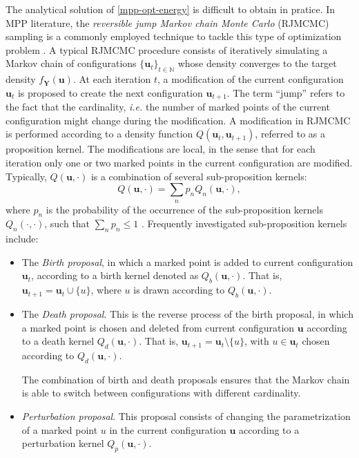 \documentclass[journal]{IEEEtran}
\begin{document}
The analytical solution of \eqref{mpp-opt-energy} is difficult to
obtain in pratice. In MPP literature, the \textit{reversible jump
  Markov chain Monte Carlo} (RJMCMC) sampling is a commonly employed
technique to tackle this type of optimization problem
\cite{descombes2013stochastic}. A typical RJMCMC procedure consists of
iteratively simulating a Markov chain of configurations
$\{ \mathbf{u}_t \}_{t \in \mathbb{N}}$ whose density converges to the
target density $f_{\mathbf{Y}}(\mathbf{u})$. At each iteration $t$, a
modification of the current configuration $\mathbf{u}_t$ is proposed
to create the next configuration $\mathbf{u}_{t+1}$. The term ``jump''
refers to the fact that the cardinality, \textit{i.e.} the number of
marked points of the current configuration might change during the
modification. A modification in RJMCMC is performed according to a
density function $Q(\mathbf{u}_t, \mathbf{u}_{t+1})$, referred to as a
proposition kernel. The modifications are local, in the sense that for
each iteration only one or two marked points in the current
configuration are modified. Typically, $Q(\mathbf{u}, \cdot)$ is a
combination of several sub-proposition kernels:
\begin{equation}
  \label{eq:sub-kernels}
  Q(\mathbf{u}, \cdot) = \sum_n p_n Q_n (\mathbf{u}, \cdot),
\end{equation}
where $p_n$ is the probability of the occurrence of the
sub-proposition kernels $Q_n(\cdot, \cdot)$, such that
$\sum_n p_n \le 1$ \cite{descombes2013stochastic}
\cite{verdie2014detecting}. Frequently investigated sub-proposition
kernels include:

\begin{itemize}

\item The \textit{Birth proposal}, in which a marked point is added to
  current configuration $\mathbf{u}_t$, according to a birth kernel
  denoted as $Q_{b}(\mathbf{u}, \cdot)$. That is,
  $\mathbf{u}_{t+1} = \mathbf{u}_t \cup \{u\}$, where $u$ is drawn
  according to $Q_{b}(\mathbf{u}, \cdot)$.

\item The \textit{Death proposal}. This is the reverse process of the
  birth proposal, in which a marked point is chosen and deleted from
  current configuration $\mathbf{u}$ according to a death kernel
  $Q_{d}(\mathbf{u}, \cdot)$. That is,
  $\mathbf{u}_{t+1} = \mathbf{u}_t \setminus \{u\}$, with
  $u \in \mathbf{u}_t$ chosen according to $Q_{d}(\mathbf{u}, \cdot)$.

  The combination of birth and death proposals ensures that the Markov
  chain is able to switch between configurations with different
  cardinality.

\item \textit{Perturbation proposal}. This proposal consists of
  changing the parametrization of a marked point $u$ in the current
  configuration $\mathbf{u}$ according to a perturbation kernel
  $Q_{p}(\mathbf{u}, \cdot)$.

\end{itemize}
\end{document}
